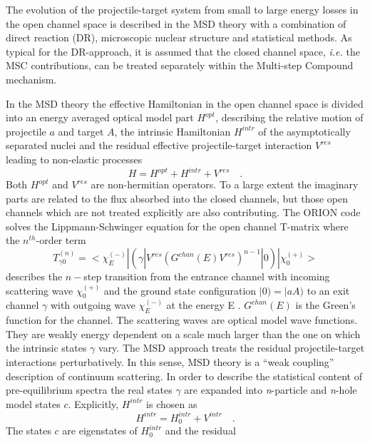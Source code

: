 \documentclass[twocolumn,amsmath,amssymb,10pt,groupedaddress,a4paper]{revtex4}
\begin{document}
The evolution of the projectile-target system from small to large
energy losses in the open channel space is described in the MSD theory
with a combination of direct reaction (DR), microscopic nuclear structure
and statistical methods. As typical for the DR-approach, it is assumed
that the closed channel space, {\it i.e.} the MSC contributions,
can be treated separately within the Multi-step Compound mechanism.

In the MSD theory the effective Hamiltonian in the open
channel space is divided into an energy averaged optical model part
$H^{opt}$, describing the relative motion of projectile $a$ and
target $A$, the intrinsic Hamiltonian $H^{intr}$ of the asymptotically
separated nuclei and the residual effective projectile-target interaction
$V^{res}$ leading to non-elastic processes
\begin{equation}
H=H^{opt}+H^{intr}+V^{res}\quad.\label{fullh}
\end{equation}
Both $H^{opt}$ and $V^{res}$ are non-hermitian operators. To a large
extent the imaginary parts are related to the flux absorbed into the
closed channels, but those open channels which are not treated explicitly
are also contributing.
The ORION code solves the Lippmann-Schwinger equation
for the open channel T-matrix where the $n^{th}$-order term
\begin{equation}
T_{\gamma0}^{(n)}=<\chi_{E}^{(-)}|(\gamma|V^{res}(G^{chan}(E)V^{res})^{n-1}|0)|\chi_{0}^{(+)}>
\label{tgamman}
\end{equation}
describes the $n-$step transition from the entrance channel with
incoming scattering wave $\chi_{0}^{(+)}$ and the ground state configuration
$|0)=|aA)$ to an exit channel $\gamma$ with outgoing wave $\chi_{E}^{(-)}$
at the energy E \cite{SLW,LW92}. $G^{chan}(E)$ is the Green's function
for the channel. The scattering waves are optical model wave functions.
They are weakly energy dependent on a scale much larger than the one
on which the intrinsic states $\gamma$ vary. The MSD
approach treats the residual projectile-target interactions perturbatively.
In this sense, MSD theory is a {}``weak coupling'' description of
continuum scattering.
In order to describe the statistical content of pre-equilibrium spectra
the real states $\gamma$ are expanded into \emph{n}-particle and
\emph{n}-hole model states $c$. Explicitly, $H^{intr}$ is chosen
as \begin{equation}
H^{intr}=H_{0}^{intr}+V^{intr}\quad.\label{hintr}\end{equation}
 The states $c$ are eigenstates of $H_{0}^{intr}$ and the residual
\end{document}
